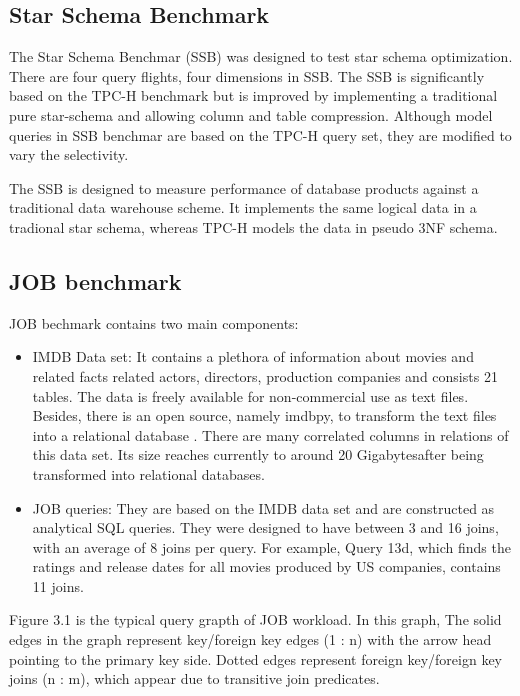 \subsection{Star Schema Benchmark}

The Star Schema Benchmar (SSB) \cite{SSB} was designed to test star schema optimization. There are four query flights, 
four dimensions in SSB. The SSB is significantly based on the TPC-H benchmark but is improved by implementing a traditional
pure star-schema and allowing column and table compression. Although model queries in SSB benchmar are based on the TPC-H 
query set, they are modified to vary the selectivity.

The SSB is designed to measure performance of database products against a traditional data warehouse scheme. It implements 
the same logical data in a tradional star schema, whereas TPC-H models the data in pseudo 3NF schema.

\subsection{JOB benchmark}

JOB bechmark \cite{JOB} contains two main components:

\begin{itemize}
	\item IMDB Data set: It contains a plethora of information about movies and related facts related actors, directors,
	 production companies and consists 21 tables. The data is freely available for non-commercial use as text files. 
	 Besides, there is an open source, namely imdbpy, to transform the text files into a relational database . There are 
	 many correlated columns in relations of this data set. Its size reaches currently to around 20 Gigabytesafter 
	 being transformed into relational databases.
	\item JOB queries: They are based on the IMDB data set and are constructed as analytical SQL queries. They were 
	designed to have between 3 and 16 joins, with an average of 8 joins per query. For example, Query 13d, which finds 
	the ratings and release dates for all movies produced by US companies, contains 11 joins.
\end{itemize}

Figure 3.1 is the typical query grapth of JOB workload. In this graph, The solid edges in the graph represent key/foreign
key edges (1 : n) with the arrow head pointing to the primary key side. Dotted edges represent foreign key/foreign key joins
(n : m), which appear due to transitive join predicates.

